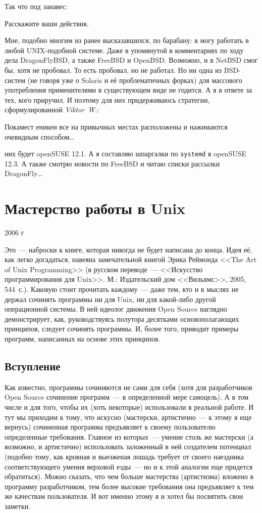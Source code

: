 Так что под занавес:
\begin{shadequote}{}
Расскажите ваши действия.
\end{shadequote}
Мне, подобно многим из ранее высказавшихся, по барабану: я могу работать в любой UNIX-подобной системе. Даже в упомянутой в комментариях по ходу дела DragonFlyBSD, а также FreeBSD и OpenBSD. Возможно, и в NetBSD смог бы, хотя не пробовал. То есть пробовал, но не работал. Но ни одна из BSD-систем (не говоря уже о Solaris и её проблематичных форках) для массового употребления применителями в существующем виде не годится. А я в ответе за тех, кого приручил. И поэтому для них придерживаюсь стратегии, сформулированной \textsl{Viktor~W}.:
\begin{shadequote}{}
Покамест еникеи все на привычных местах расположены и нажимаются очевидным способом\dots
\end{shadequote}

 них будет openSUSE 12.1. А я составляю шпаргалки по \texttt{systemd} в openSUSE 12.3. А также смотрю новости по FreeBSD и читаю списки рассылки DragonFly\dots

\section{Мастерство работы в Unix} 
\begin{timeline}2006 г\end{timeline}

Это~--- наброски к книге, которая никогда не будет написана до конца. Идея её, как легко догадаться, навеяна замечательной книгой Эрика Реймонда <<The Art of Unix Programming>> (в русском переводе~--- <<Искусство программирования для Unix>>. М.: Издательский дом <<Вильямс>>, 2005, 544~с.). Каковую стоит прочитать каждому~--- даже тем, кто и в мыслях не держал сочинять программы ни для Unix, ни для какой-либо другой операционной системы. В ней идеолог движения Open Source наглядно демонстрирует, как, руководствуясь полутора десятками основополагающих принципов, следует сочинять программы. И, более того, приводит примеры программ, написанных на основе этих принципов.

\subsection{Вступление}
Как известно, программы сочиняются не сами для себя (хотя для разработчиков Open Source сочинение программ~--- в определенной мере самоцель). А в том числе и для того, чтобы их (хоть некоторые) использовали в реальной работе. И тут мы приходим к тому, что искусно (мастерски, артистично~--- к этому я еще вернусь) сочиненная программа предъявляет к своему пользователю определенные требования. Главное из которых~--- умение столь же мастерски (а возможно, и артистично) использовать заложенный в ней создателем потенциал (подобно тому, как кровная и выезженая лошадь требует от своего наездника соответствующего умения верховой езды~--- но и к этой аналогии еще придется обратиться). Можно сказать, что чем больше мастерства (артистизма) вложено в программу разработчиком, тем более высокие требования она предъявляет к тем же качествам пользователя. И вот именно этому я и хотел бы посвятить свои заметки.

